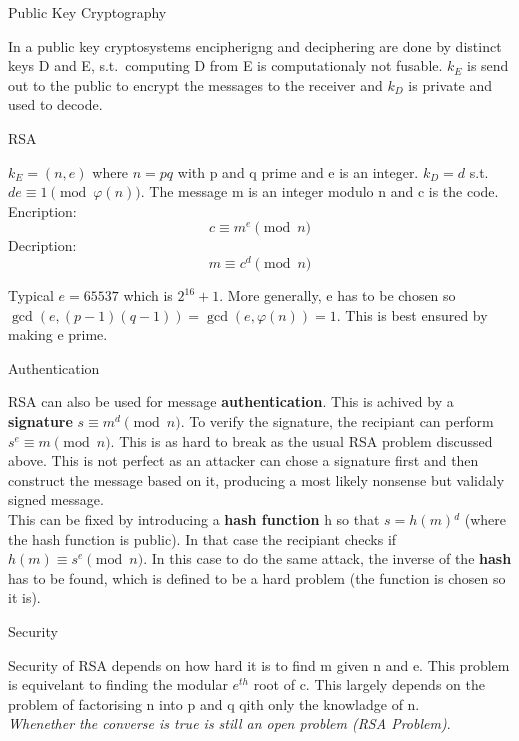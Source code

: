 \documentclass[12pt, letterpaper]{article}
\begin{document}
\begin{section}{Public Key Cryptography}

  In a public key cryptosystems encipherigng and deciphering are done by
  distinct keys D and E, s.t.\ computing D from E is computationaly not fusable.
  \(k_{E}\) is send out to the public to encrypt the messages to the receiver
  and \(k_{D}\) is private and used to decode.

  \begin{subsection}{RSA}

    \(k_{E} = (n, e)\) where \(n = pq\) with p and q prime and e is an
    integer. \(k_{D} = d\) s.t.\ \(de \equiv 1 \pmod{\varphi(n)}\). The
    message m is an integer modulo n and c is the code. \\
    Encription: \[c \equiv m^{e} \pmod{n}\]
    Decription: \[m \equiv c^{d} \pmod{n}\]

    Typical \(e = 65537\) which is \(2^{16} + 1\). More generally, e has to be
    chosen so \(\gcd(e, (p - 1)(q - 1)) = \gcd(e, \varphi(n)) = 1\). This is
    best ensured by making e prime.

    \begin{subsubsection}{Authentication}

      RSA can also be used for message \textbf{authentication}. This is achived
      by a \textbf{signature} \(s \equiv m^{d} \pmod{n}\). To verify the
      signature, the recipiant can perform \(s^{e} \equiv m \pmod{n}\). This is as
      hard to break as the usual RSA problem discussed above. This is not perfect
      as an attacker can chose a signature first and then construct the message
      based on it, producing a most likely nonsense but validaly signed message. \\
      This can be fixed by introducing a \textbf{hash function} h so that
      \(s = h(m){}^{d}\) (where the hash function is public). In that case the
      recipiant checks if \(h(m) \equiv s^{e} \pmod{n}\). In this case to do the
      same attack, the inverse of the \textbf{hash} has to be found, which is
      defined to be a hard problem (the function is chosen so it is).

    \end{subsubsection}

    \begin{subsubsection}{Security}

      Security of RSA depends on how hard it is to find m given n and e. This
      problem is equivelant to finding the modular \(e^{th}\) root of c. This
      largely depends on the problem of factorising n into p and q qith only
      the knowladge of n. \\
      \textit{Whenether the converse is true is still an open problem (RSA
        Problem)}.


\end{subsubsection}
\end{subsection}
\end{section}
\end{document}
